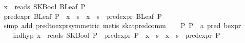 \begin{isabellebody}
\ {}x\ {}\ reads\ {}SKBool\ {}BLeaf\ P{}{}{}\isanewline
\ \ \isamarkupfalse%
\ {}pred{}expr\ {}BLeaf\ P{}\ {}\ x\ {}{}\ s\ {}\ x\ {}{}\ s\ {}\ pred{}expr\ {}BLeaf\ P{}{}\isanewline
\ \ \ \ \isamarkupfalse%
\ {}simp\ add{}\ pred{}to{}expr{}symmetric{}{}\ metis\ skat{}pred{}comm{}\isanewline
{}\isamarkupfalse%
\isanewline
\ \ \isamarkupfalse%
\ P{}\ P{}\ {}{}\ {}{}a\ pred\ bexpr{}\isanewline
\ \ \isamarkupfalse%
\ ind{}hyp{}{}\ {}x\ {}\ reads\ {}SKBool\ P{}{}\ {}\ pred{}expr\ P{}\ {}\ x\ {}{}\ s\ {}\ x\ {}{}\ s\ {}\ pred{}expr\ P{}{}\isanewline

\end{isabellebody}
